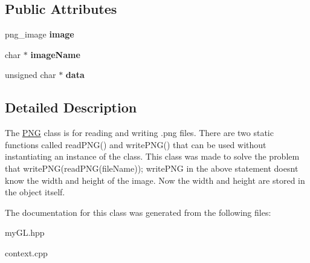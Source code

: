 \subsection*{Public Attributes}
\begin{DoxyCompactItemize}
\item 
png\+\_\+image {\bfseries image}\hypertarget{classPNG_adcccee60854d7ef75c4f516b26d9be7e}{}\label{classPNG_adcccee60854d7ef75c4f516b26d9be7e}

\item 
char $\ast$ {\bfseries image\+Name}\hypertarget{classPNG_af06d37031363a6e28cd16cde17fe87bf}{}\label{classPNG_af06d37031363a6e28cd16cde17fe87bf}

\item 
unsigned char $\ast$ {\bfseries data}\hypertarget{classPNG_af96e0999d0c4b3fb0219462daf297d92}{}\label{classPNG_af96e0999d0c4b3fb0219462daf297d92}

\end{DoxyCompactItemize}


\subsection{Detailed Description}
The \hyperlink{classPNG}{P\+NG} class is for reading and writing \textquotesingle{}.png\textquotesingle{} files. There are two static functions called read\+P\+N\+G() and write\+P\+N\+G() that can be used without instantiating an instance of the class. This class was made to solve the problem that write\+P\+N\+G(read\+P\+N\+G(file\+Name)); write\+P\+NG in the above statement doesn\textquotesingle{}t know the width and height of the image. Now the width and height are stored in the object itself. 

The documentation for this class was generated from the following files\+:\begin{DoxyCompactItemize}
\item 
my\+G\+L.\+hpp\item 
context.\+cpp\end{DoxyCompactItemize}
